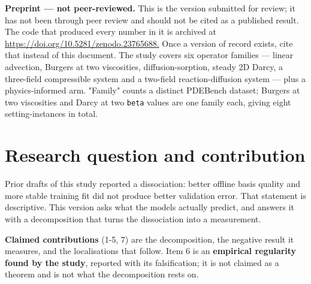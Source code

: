 \documentclass[preprint,12pt]{elsarticle}
\begin{document}
\textbf{Preprint --- not peer-reviewed.} This is the version submitted for review; it has not been through peer review and should not be cited as a published result. The code that produced every number in it is archived at \url{https://doi.org/10.5281/zenodo.23765688.} Once a version of record exists, cite that instead of this document.
The study covers six operator families --- linear advection, Burgers at two viscosities, diffusion-sorption, steady 2D Darcy, a three-field compressible system and a two-field reaction-diffusion system --- plus a physics-informed arm. "Family" counts a distinct PDEBench dataset; Burgers at two viscosities and Darcy at two \texttt{beta} values are one family each, giving eight setting-instances in total.
\section{Research question and contribution}

Prior drafts of this study reported a dissociation: better offline basis quality and more stable training fit did not produce better validation error. That statement is descriptive. This version asks what the models actually predict, and answers it with a decomposition that turns the dissociation into a measurement.

\textbf{Claimed contributions} (1-5, 7) are the decomposition, the negative result it measures, and the localisations that follow. Item 6 is an \textbf{empirical regularity found by the study}, reported with its falsification; it is not claimed as a theorem and is not what the decomposition rests on.
\end{document}
